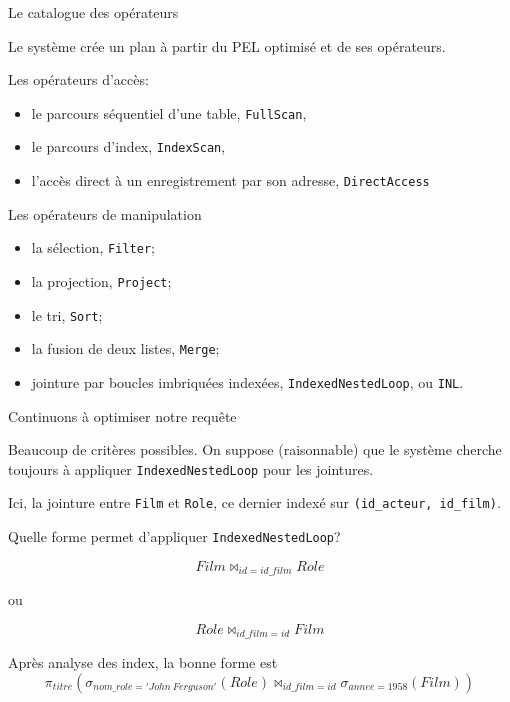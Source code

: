 \begin{frame}{Le catalogue des opérateurs}

Le système crée un plan à partir du PEL optimisé et de ses opérateurs.

\vfill

\alert{Les opérateurs d'accès}:
\begin{itemize}
  \item le parcours séquentiel d'une table, \texttt{FullScan},
  \item le parcours d'index, \texttt{IndexScan},
  \item l'accès direct à un enregistrement par son adresse, \texttt{DirectAccess}
\end{itemize}

\alert{Les opérateurs de manipulation}

\begin{itemize}
  \item la sélection, \texttt{Filter};
  \item  la projection, \texttt{Project};
  \item  le tri, \texttt{Sort};
  \item  la fusion de deux listes, \texttt{Merge};
  \item  jointure par boucles imbriquées indexées, \texttt{IndexedNestedLoop}, ou  \texttt{INL}.
\end{itemize}

\end{frame}

\begin{frame}{Continuons à optimiser notre requête}

Beaucoup de critères possibles. On suppose (raisonnable) que le système 
cherche toujours à appliquer  \texttt{IndexedNestedLoop} pour les jointures.

\vfill

Ici, la jointure entre \texttt{Film} et \texttt{Role}, ce dernier  indexé sur 
\texttt{(id\_acteur, id\_film)}. 

\vfill

Quelle forme permet d'appliquer \texttt{IndexedNestedLoop}?

\[
  Film \Join_{id=id\_film} Role
\]
  
ou 

\[
   Role \Join_{id\_film=id} Film
\]

\vfill

Après analyse des index, la bonne forme est
\[
   \pi_{titre}(\sigma_{nom\_role='John\ Ferguson'}(Role)  \Join_{id\_film=id}  \sigma_{annee=1958} (Film) )
\]

\end{frame}

